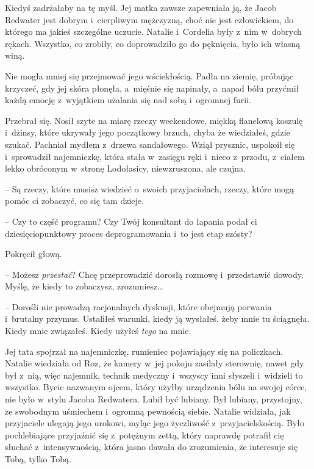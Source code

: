 \documentclass[oneside,polish,11pt,sfheadings]{mwbk}
\begin{document}
Kiedyś zadrżałaby na tę myśl. Jej matka zawsze zapewniała ją, że Jacob
Redwater jest dobrym i~cierpliwym mężczyzną, choć nie jest człowiekiem,
do którego ma jakieś szczególne uczucie. Natalie i~Cordelia były z~nim w~dobrych rękach. Wszystko, co zrobiły, co doprowadziło go do pęknięcia,
było ich własną winą.

Nie mogła mniej się przejmować jego wściekłością. Padła na ziemię,
próbując krzyczeć, gdy jej skóra płonęła, a~mięśnie się napinały, a~napad bólu przyćmił każdą emocję z~wyjątkiem użalania się nad sobą i~ogromnej furii.

Przebrał się. Nosił szyte na miarę rzeczy weekendowe, miękką flanelową
koszulę i~dżinsy, które ukrywały jego początkowy brzuch, chyba że
wiedziałeś, gdzie szukać. Pachniał mydłem z~drzewa sandałowego. Wziął
prysznic, uspokoił się i~sprowadził najemniczkę, która stała w~zasięgu
ręki i~nieco z~przodu, z~ciałem lekko obróconym w~stronę Lodołasicy,
niewzruszona, ale czujna.

-- Są rzeczy, które musisz wiedzieć o~swoich przyjaciołach, rzeczy, które
mogą pomóc ci zobaczyć, co się tam dzieje.

-- Czy to część programu? Czy Twój konsultant do łapania podał ci
dziesięciopunktowy proces deprogramowania i~to jest etap szósty?

Pokręcił głową. 

-- Możesz \textit{przestać}? Chcę przeprowadzić dorosłą
rozmowę i~przedstawić dowody. Myślę, że kiedy to zobaczysz,
zrozumiesz\ldots 

-- Dorośli nie prowadzą racjonalnych dyskusji, które obejmują porwania i~brutalny przymus. Ustaliłeś warunki, kiedy ją wysłałeś, żeby mnie tu
ściągnęła. Kiedy mnie związałeś. Kiedy użyłeś \textit{tego} na mnie.

Jej tata spojrzał na najemniczkę, rumieniec pojawiający się na
policzkach. Natalie wiedziała od Roz, że kamery w~jej pokoju zasilały
sterownię, nawet gdy był z~nią, więc najemnik, technik medyczny i~wszyscy inni słyszeli i~widzieli to wszystko. Bycie nazwanym ojcem,
który użyłby urządzenia bólu na swojej córce, nie było w~stylu Jacoba
Redwatera. Lubił być lubiany. Był lubiany, przystojny, ze swobodnym
uśmiechem i~ogromną pewnością siebie. Natalie widziała, jak przyjaciele
ulegają jego urokowi, myląc jego życzliwość z~przyjacielskością. Było
pochlebiające przyjaźnić się z~potężnym zettą, który naprawdę potrafił
cię słuchać z~intensywnością, która jasno dawała do zrozumienia, że
interesuje się Tobą, tylko Tobą.
\end{document}
